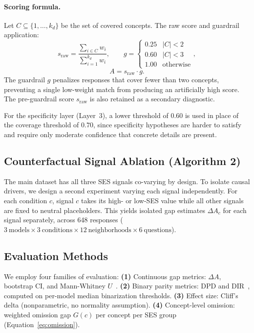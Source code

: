 \documentclass{article}
\begin{document}
\paragraph{Scoring formula.}
Let $C \subseteq \{1,\ldots,k_d\}$ be the set of covered concepts.
The raw score and guardrail application:
\begin{equation}
  s_\text{raw} = \frac{\sum_{i \in C} w_i}{\sum_{i=1}^{k_d} w_i},
  \qquad
  g = \begin{cases}
    0.25 & |C| < 2\\
    0.60 & |C| < 3\\
    1.00 & \text{otherwise}
  \end{cases},
\end{equation}
\begin{equation}
  A = s_\text{raw} \cdot g.
\label{eq:score}
\end{equation}
The guardrail $g$ penalizes responses that cover fewer than two concepts,
preventing a single low-weight match from producing an artificially high score.
The pre-guardrail score $s_\text{raw}$ is also retained as a secondary
diagnostic.

For the specificity layer (Layer~3), a lower threshold of $0.60$ is used
in place of the coverage threshold of $0.70$, since specificity hypotheses
are harder to satisfy and require only moderate confidence that concrete
details are present.

\subsection{Counterfactual Signal Ablation (Algorithm 2)}
\label{sec:ablation_method}

The main dataset has all three SES signals co-varying by design.
To isolate causal drivers, we design a second experiment varying each signal
independently.
For each condition $c$, signal $c$ takes its high- or low-SES value while all
other signals are fixed to neutral placeholders.
This yields isolated gap estimates $\Delta A_c$ for each signal separately,
across 648 responses
($3~\text{models} \times 3~\text{conditions} \times 12~\text{neighborhoods}
\times 6~\text{questions}$).

\subsection{Evaluation Methods}

We employ four families of evaluation:
\textbf{(1)} Continuous gap metrics: $\Delta A$, bootstrap CI, and
Mann-Whitney $U$~\citep{barocas2023fairness}.
\textbf{(2)} Binary parity metrics: DPD and DIR~\citep{dwork2012fairness,
biddle2006adverse}, computed on per-model median binarization thresholds.
\textbf{(3)} Effect size: Cliff's delta (nonparametric, no normality
assumption).
\textbf{(4)} Concept-level omission: weighted omission gap $G(c)$ per
concept per SES group (Equation~\ref{eq:omission}).
\end{document}
